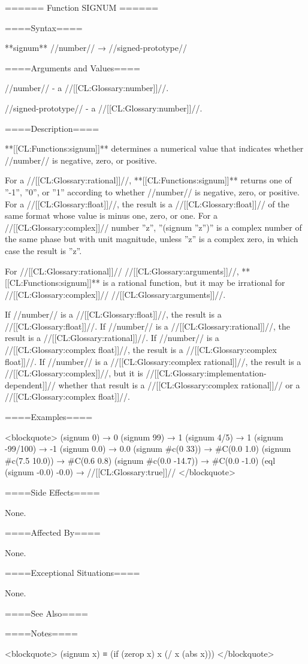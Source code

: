 ====== Function SIGNUM ======

====Syntax====

**signum** //number// → //signed-prototype//

====Arguments and Values====

//number// - a //[[CL:Glossary:number]]//.

//signed-prototype// - a //[[CL:Glossary:number]]//.

====Description====

**[[CL:Functions:signum]]** determines a numerical value that indicates whether //number// is negative, zero, or positive.

For a //[[CL:Glossary:rational]]//, **[[CL:Functions:signum]]** returns one of ''-1'', ''0'', or ''1'' according to whether //number// is negative, zero, or positive. For a //[[CL:Glossary:float]]//, the result is a //[[CL:Glossary:float]]// of the same format whose value is minus one, zero, or one. For a //[[CL:Glossary:complex]]// number ''z'', ''(signum ''z'')'' is a complex number of the same phase but with unit magnitude, unless ''z'' is a complex zero, in which case the result is ''z''.

For //[[CL:Glossary:rational]]// //[[CL:Glossary:arguments]]//, **[[CL:Functions:signum]]** is a rational function, but it may be irrational for //[[CL:Glossary:complex]]// //[[CL:Glossary:arguments]]//.

If //number// is a //[[CL:Glossary:float]]//, the result is a //[[CL:Glossary:float]]//. If //number// is a //[[CL:Glossary:rational]]//, the result is a //[[CL:Glossary:rational]]//. If //number// is a //[[CL:Glossary:complex float]]//, the result is a //[[CL:Glossary:complex float]]//. If //number// is a //[[CL:Glossary:complex rational]]//, the result is a //[[CL:Glossary:complex]]//, but it is //[[CL:Glossary:implementation-dependent]]// whether that result is a //[[CL:Glossary:complex rational]]// or a //[[CL:Glossary:complex float]]//.

====Examples====

<blockquote> (signum 0) → 0 (signum 99) → 1 (signum 4/5) → 1 (signum -99/100) → -1 (signum 0.0) → 0.0 (signum #c(0 33)) → #C(0.0 1.0) (signum #c(7.5 10.0)) → #C(0.6 0.8) (signum #c(0.0 -14.7)) → #C(0.0 -1.0) (eql (signum -0.0) -0.0) → //[[CL:Glossary:true]]// </blockquote>

====Side Effects====

None.

====Affected By====

None.

====Exceptional Situations====

None.

====See Also====

{\secref\FloatSubstitutability}

====Notes====

<blockquote> (signum x) ≡ (if (zerop x) x (/ x (abs x))) </blockquote>

